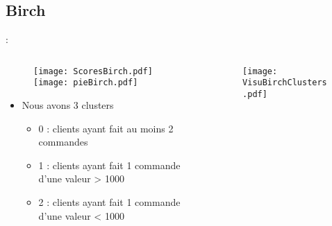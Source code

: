 \documentclass[8pt,aspectratio=169,hyperref={unicode=true}]{beamer}
\begin{document}
\subsection{Birch}
\begin{frame}{\insertsection: \insertsubsection}
    \begin{columns}
        \begin{column}{.55\textwidth}
            \begin{figure}
                \hfill
                \texttt{[image: ScoresBirch.pdf]}
                \hfill
                \texttt{[image: pieBirch.pdf]}
                \hfill
            \end{figure}
            \begin{itemize}
                \item Nous avons 3 clusters
                      \begin{itemize}
                          \item 0 : clients ayant fait au moins 2 commandes
                          \item 1 : clients ayant fait 1 commande d'une valeur > 1000
                          \item 2 : clients ayant fait 1 commande d'une valeur < 1000
                      \end{itemize}
            \end{itemize}
        \end{column}
        \begin{column}{.45\textwidth}
            \begin{figure}
                \texttt{[image: VisuBirchClusters.pdf]}
            \end{figure}
        \end{column}
    \end{columns}
\end{frame}
\end{document}
